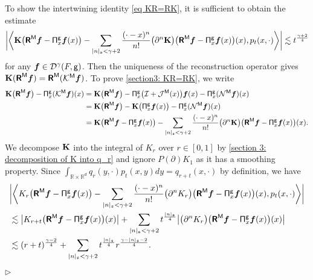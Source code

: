 \documentclass[10pt, reqno]{amsart}
\numberwithin{subsection}{section}
\numberwithin{subsubsection}{subsection}
\numberwithin{equation}{section} %
\newenvironment{Dem}[1][\unskip]{%
    \begin{list}{\hspace{1.15cm}{\sf \textbf{{\small Proof #1 --}}}}{%
        \setlength{\topsep}{0pt}%
        \setlength{\leftmargin}{0pt}%
        \setlength{\rightmargin}{0pt}%
        \setlength{\listparindent}{0pt}%
        \setlength{\itemindent}{0pt}%
        \setlength{\parsep}{0pt}%
        \addtolength{\leftmargin}{0pt}%
        \addtolength{\rightmargin}{0pt}%
    } \item }{\hfill $\rhd$\end{list}\smallskip}
\theoremstyle{mystyle}
\theoremstyle{mystyle2}
\theoremstyle{mystyle3}
\newcommand{\bsf}{\boldsymbol{f}}
\newcommand\bbR{\mathbb{R}}
\newcommand{\mcD}{\mathcal{D}}
\newcommand{\mcI}{\mathcal{I}}
\newcommand{\mcJ}{\mathcal{J}}
\newcommand{\mcK}{\mathcal{K}}
\newcommand{\mcN}{\mathcal{N}}
\begin{document}
\begin{Dem}[of Theorem \ref{thm wellposedness of K}]
{To show the intertwining identity \eqref{eq KR=RK}, it is sufficient to obtain the estimate
\begin{align}\label{section3: KR=RK}
\bigg\vert\bigg\langle{\bf K}\big(\textbf{\textsf{R}}^{\sf M}\bsf-{\sf\Pi}_x^{\sf g}\bsf(x)\big)
-\sum_{|n|_{\frak{s}}<\gamma+2}\frac{(\cdot-x)^n}{n!}\big(\partial^n{\bf K}\big)\big(\textbf{\textsf{R}}^{\sf M}\bsf - {\sf\Pi}_x^{\sf g}\bsf(x)\big)(x),p_t(x,\cdot)\bigg\rangle\bigg\vert
\lesssim t^{\frac{\gamma+2}4}
\end{align}
for any $\bsf\in\mcD^\gamma(F,{\sf g})$.
Then the uniqueness of the reconstruction operator gives ${\bf K}(\textbf{\textsf{R}}^{\sf M}\bsf) = \textbf{\textsf{R}}^{\sf M}(\mcK^{\sf M}\bsf)$. To prove \eqref{section3: KR=RK}, we write
\begin{align*}
{\bf K}\big(\textbf{\textsf{R}}^{\sf M}\bsf\big)-{\sf\Pi}_x^{\sf g}(\mcK^{\sf M}\bsf)(x)
&={\bf K}\big(\textbf{\textsf{R}}^{\sf M}\bsf\big)-{\sf\Pi}_x^{\sf g}\big(\mcI+\mcJ^{\sf M}(x)\big)\bsf(x)-{\sf\Pi}_x^{\sf g}(\mcN^{\sf M}\bsf)(x)\\
&={\bf K}\big(\textbf{\textsf{R}}^{\sf M}\bsf\big)-{\bf K}\big({\sf\Pi}_x^{\sf g}\bsf(x)\big)
-{\sf\Pi}_x^{\sf g}(\mcN^{\sf M}\bsf)(x)\\
&={\bf K}\big(\textbf{\textsf{R}}^{\sf M}\bsf-{\sf\Pi}_x^{\sf g}\bsf(x)\big)
-\sum_{|n|_{\frak{s}}<\gamma+2}\frac{(\cdot-x)^n}{n!}\big(\partial^n{\bf K}\big)\big(\textbf{\textsf{R}}^{\sf M}\bsf - {\sf\Pi}_x^{\sf g}\bsf(x)\big)(x).
\end{align*}
We decompose ${\bf K}$ into the integral of $K_r$ over $r\in[0,1]$ by \eqref{section 3: decomposition of K into q_r} and ignore $P(\partial)K_1$ as it has a smoothing property. Since $\int_{\bbR\times\bbR^d}q_r(y,\cdot)p_t(x,y)dy=q_{r+t}(x,\cdot)$ by definition, we have
\begin{align*}
&\bigg\vert\bigg\langle K_r\big(\textbf{\textsf{R}}^{\sf M}\bsf-{\sf\Pi}_x^{\sf g}\bsf(x)\big)
-\sum_{|n|_{\frak{s}}<\gamma+2}\frac{(\cdot-x)^n}{n!}\big(\partial^nK_r\big)\big(\textbf{\textsf{R}}^{\sf M}\bsf - {\sf\Pi}_x^{\sf g}\bsf(x)\big)(x),p_t(x,\cdot)\bigg\rangle\bigg\vert\\
&\lesssim \big\vert K_{r+t}\big(\textbf{\textsf{R}}^{\sf M}\bsf-{\sf\Pi}_x^{\sf g}\bsf(x)\big)(x)\big\vert
+\sum_{|n|_{\frak{s}}<\gamma+2}t^{\frac{|n|_{\frak{s}}}4}\big\vert \big(\partial^nK_r\big)\big(\textbf{\textsf{R}}^{\sf M}\bsf - {\sf\Pi}_x^{\sf g}\bsf(x)\big)(x)\big\vert\\
&\lesssim (r+t)^{\frac{\gamma-2}4}+\sum_{|n|_{\frak{s}}<\gamma+2}t^{\frac{|n|_{\frak{s}}}4}r^{\frac{\gamma-|n|_{\frak{s}}-2}4}.

\end{align*}}
\end{Dem}
\end{document}

